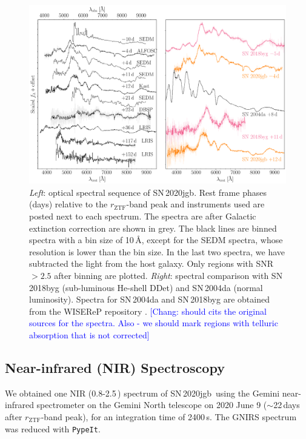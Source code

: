 \documentclass[twocolumn]{aastex631}
\newcommand{\sn}{SN\,2020jgb}
\newcommand{\chang}[1]{\textcolor{blue}{[Chang: #1]}}
\begin{document}

\begin{figure}
    \centering
    \includegraphics[width=\textwidth]{optical_spec_evolution.pdf}
    \caption{\textit{Left}: optical spectral sequence of \sn. Rest frame phases (days) relative to the $r_\mathrm{ZTF}$-band peak and instruments used are posted next to each spectrum. The spectra are after Galactic extinction correction are shown in grey. The black lines are binned spectra with a bin size of 10\,\r{A}, except for the SEDM spectra, whose resolution is lower than the bin size. In the last two spectra, we have subtracted the light from the host galaxy. Only regions with SNR $>2.5$ after binning are plotted. 
    \textit{Right}: spectral comparison with SN\,2018byg (sub-luminous He-shell DDet) and SN\,2004da (normal luminosity). Spectra for SN\,2004da and SN\,2018byg are obtained from the WISEReP repository \citep{wiserep_2012}. \chang{should cits the original sources for the spectra. Also - we should mark regions with telluric absorption that is not corrected}} %
    \label{fig:spec_evo}
\end{figure}

\subsection{Near-infrared (NIR) Spectroscopy}
We obtained one NIR (0.8-2.5\,\micron) spectrum of \sn\ using the Gemini near-infrared spectrometer \citep[GNIRS;][]{GNIRS1998} on the Gemini North telescope on 2020 June 9 ($\sim$22\,days after $r_\mathrm{ZTF}$-band peak), for an integration time of 2400\,s. The GNIRS spectrum was reduced with \texttt{PypeIt}.
\end{document}
